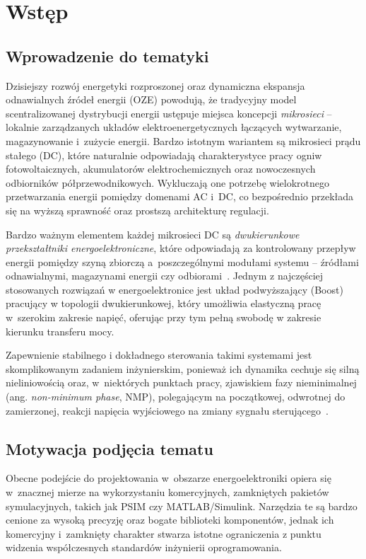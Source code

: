 \chapter{Wstęp}
\label{ch:wstep}

\section{Wprowadzenie do tematyki}
\label{sec:wprowadzenie}

Dzisiejszy rozwój energetyki rozproszonej oraz dynamiczna ekspansja odnawialnych źródeł energii (OZE) powodują, że tradycyjny model scentralizowanej dystrybucji energii ustępuje miejsca koncepcji \emph{mikrosieci} -- lokalnie zarządzanych układów elektroenergetycznych łączących wytwarzanie, magazynowanie i~zużycie energii. Bardzo istotnym wariantem są mikrosieci prądu stałego (DC), które naturalnie odpowiadają charakterystyce pracy ogniw fotowoltaicznych, akumulatorów elektrochemicznych oraz nowoczesnych odbiorników półprzewodnikowych. Wykluczają one potrzebę wielokrotnego przetwarzania energii pomiędzy domenami AC i~DC, co bezpośrednio przekłada się na wyższą sprawność oraz prostszą architekturę regulacji.

Bardzo ważnym elementem każdej mikrosieci DC są \emph{dwukierunkowe przekształtniki energoelektroniczne}, które odpowiadają za kontrolowany przepływ energii pomiędzy szyną zbiorczą a~poszczególnymi modułami systemu -- źródłami odnawialnymi, magazynami energii czy odbiorami~\cite{erickson2020}. Jednym z najczęściej stosowanych rozwiązań w energoelektronice jest układ podwyższający (Boost) pracujący w topologii dwukierunkowej, który umożliwia elastyczną pracę w~szerokim zakresie napięć, oferując przy tym pełną swobodę w zakresie kierunku transferu mocy.

Zapewnienie stabilnego i dokładnego sterowania takimi systemami jest skomplikowanym zadaniem inżynierskim, ponieważ ich dynamika cechuje się silną nieliniowością oraz, w~niektórych punktach pracy, zjawiskiem fazy nieminimalnej (ang. \emph{non-minimum phase}, NMP), polegającym na początkowej, odwrotnej do zamierzonej, reakcji napięcia wyjściowego na zmiany sygnału sterującego~\cite{tatari2024mfbb}.

\section{Motywacja podjęcia tematu}
\label{sec:motywacja}

Obecne podejście do projektowania w~obszarze energoelektroniki opiera się w~znacznej mierze na wykorzystaniu komercyjnych, zamkniętych pakietów symulacyjnych, takich jak PSIM czy MATLAB/Simulink. Narzędzia te są bardzo cenione za wysoką precyzję oraz bogate biblioteki komponentów, jednak ich komercyjny i~zamknięty charakter stwarza istotne ograniczenia z punktu widzenia współczesnych standardów inżynierii oprogramowania.

